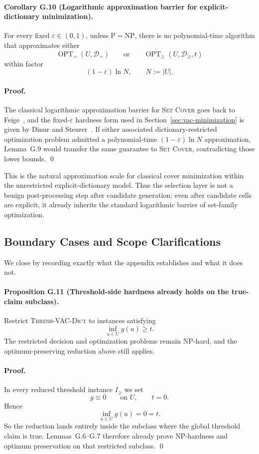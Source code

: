 \paragraph{Corollary G.10 (Logarithmic approximation barrier for explicit-dictionary minimization).}
For every fixed $\varepsilon\in(0,1)$, unless $\mathrm P=\mathrm{NP}$, there is no polynomial-time algorithm that approximates either
\[
\operatorname{OPT}_{=}(U,\mathcal D_{=})
\qquad\text{or}\qquad
\operatorname{OPT}_{\ge}(U,\mathcal D_{\ge},t)
\]
within factor
\[
(1-\varepsilon)\ln N,
\qquad N:=|U|.
\]

\paragraph{Proof.}
The classical logarithmic approximation barrier for \textsc{Set Cover} goes back to Feige~\cite{Feige1998SetCover}, and the fixed-$\varepsilon$ hardness form used in Section~\ref{sec:vac-minimization} is given by Dinur and Steurer~\cite{DinurSteurer2014}. If either associated dictionary-restricted optimization problem admitted a polynomial-time $(1-\varepsilon)\ln N$ approximation, Lemma~G.9 would transfer the same guarantee to \textsc{Set Cover}, contradicting those lower bounds. \qed

This is the natural approximation scale for classical cover minimization within the unrestricted explicit-dictionary model. Thus the selection layer is not a benign post-processing step after candidate generation; even after candidate cells are explicit, it already inherits the standard logarithmic barrier of set-family optimization.

\subsection{Boundary Cases and Scope Clarifications}

We close by recording exactly what the appendix establishes and what it does not.

\paragraph{Proposition G.11 (Threshold-side hardness already holds on the true-claim subclass).}
Restrict \textsc{Thresh-VAC-Dict} to instances satisfying
\[
\inf_{u\in U} g(u)\ge t.
\]
The restricted decision and optimization problems remain NP-hard, and the optimum-preserving reduction above still applies.

\paragraph{Proof.}
In every reduced threshold instance $I_{\ge}$ we set
\[
g\equiv 0
\qquad\text{on }U,
\qquad
 t=0.
\]
Hence
\[
\inf_{u\in U} g(u)=0=t.
\]
So the reduction lands entirely inside the subclass where the global threshold claim is true. Lemmas~G.6--G.7 therefore already prove NP-hardness and optimum preservation on that restricted subclass. \qed

